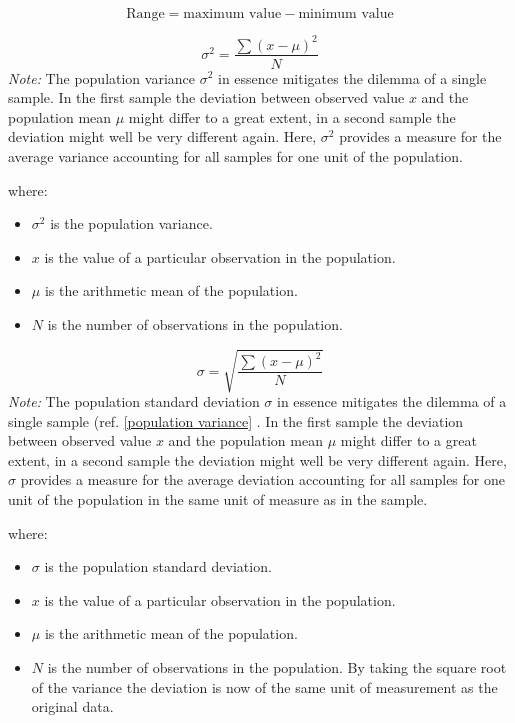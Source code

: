 \begin{equation}
\label{range}
\text{Range} = \text{maximum value} - \text{minimum value}
\end{equation}
\hformbar


\begin{equation}
\label{population variance}
\sigma^2 = \frac{\sum (x - \mu)^2}{N}
\end{equation}
\textit{Note:} The population variance $\sigma^2$ in essence mitigates the dilemma of a single sample. In the first sample the deviation between observed value $x$ and the population mean $\mu$ might differ to a great extent, in a second sample the deviation might well be very different again. Here, $\sigma^2$ provides a measure for the average variance accounting for all samples for one unit of the population.

where:
\begin{itemize}
 \item $\sigma^2$ is the population variance.
 \item $x$ is the value of a particular observation in the population.
 \item $\mu$ is the arithmetic mean of the population.
 \item $N$ is the number of observations in the population.
\end{itemize}
\hformbar


\begin{equation}
\label{population standard deviation}
\sigma = \sqrt{\frac{\sum (x - \mu)^2}{N}}
\end{equation}
\textit{Note:} The population standard deviation $\sigma$ in essence mitigates the dilemma of a single sample (ref. \eqref{population variance} . In the first sample the deviation between observed value $x$ and the population mean $\mu$ might differ to a great extent, in a second sample the deviation might well be very different again. Here, $\sigma$ provides a measure for the average deviation accounting for all samples for one unit of the population in the same unit of measure as in the sample.

where:
\begin{itemize}
 \item $\sigma$ is the population standard deviation.
 \item $x$  is the value of a particular observation in the population.
 \item $\mu$ is the arithmetic mean of the population.
 \item $N$ is the number of observations in the population.
By taking the square root of the variance the deviation is now of the same unit of measurement as the original data.
\end{itemize}
\hformbar

